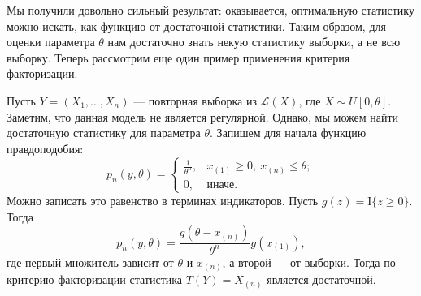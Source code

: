 Мы получили довольно сильный результат: оказывается, оптимальную статистику можно искать, как функцию от достаточной статистики. Таким образом, для оценки параметра $\theta$ нам достаточно знать некую статистику выборки, а не всю выборку. Теперь рассмотрим еще один пример применения критерия факторизации.

\begin{example}
    Пусть $Y = (X_1, \ldots, X_n)$ --- повторная выборка из $\mathcal{L}(X)$, где $X \sim U[0, \theta]$. Заметим, что данная модель не является регулярной. Однако, мы можем найти достаточную статистику для параметра $\theta$. Запишем для начала функцию правдоподобия:
    \[
        p_n(y, \theta) = \begin{cases} \frac{1}{\theta^n}, & x_{(1)} \geqslant 0,\  x_{(n)} \leqslant \theta; \\ 0, & \text{иначе}. \end{cases}
    \]
    Можно записать это равенство в терминах индикаторов. Пусть $g(z) = \mathrm{I}\{z \geqslant 0\}$. Тогда
    \[
        p_n(y, \theta) = \frac{g(\theta - x_{(n)})}{\theta^n} g(x_{(1)}),
    \]
    где первый множитель зависит от $\theta$ и $x_{(n)}$, а второй --- от выборки. Тогда по критерию факторизации статистика $T(Y) = X_{(n)}$ является достаточной.
\end{example}
